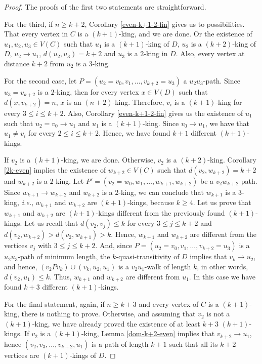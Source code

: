\documentclass[preprint]{elsarticle}
\begin{document}
\begin{proof}
The proofs of the first two statements are straightforward.

For the third, if $n \ge k+2$, Corollary \ref{even-k+1-2-fin} gives us to possibilities.   That every vertex in $C$ is a $(k+1)$-king, and we are done.   Or the existence of $u_1, u_2, u_3 \in V(C)$ such that $u_1$ is a $(k+1)$-king of $D$, $u_2$ is a $(k+2)$-king of $D$, $u_2 \to u_1$, $d(u_2, u_3) = k+2$ and $u_3$ is a $2$-king in $D$.   Also, every vertex at distance $k+2$ from $u_2$ is a $3$-king.

For the second case, let $P = (u_2 = v_0, v_1, \dots, v_{k+2} = u_3)$ a $u_2 u_3$-path.   Since $u_3 = v_{k+2}$ is a $2$-king, then for every vertex $x \in V(D)$ such that $d(x, v_{k+2}) = n$, $x$ is an $(n+2)$-king.   Therefore, $v_i$ is a $(k+1)$-king for every $3 \le i \le k+2$.   Also, Corollary \ref{even-k+1-2-fin} gives us the existence of $u_1$ such that $u_2 = v_0 \to u_1$ and $u_1$ is a $(k+1)$-king.   Since $v_0 \to u_1$, we have that $u_1 \ne v_i$ for every $2 \le i \le k+2$.   Hence, we have found $k+1$ different $(k+1)$-kings.

If $v_2$ is a $(k+1)$-king, we are done.   Otherwise, $v_2$ is a $(k+2)$-king.   Corollary \ref{2k-even} implies the existence of $w_{k+2} \in V(C)$ such that $d(v_2, w_{k+2}) = k+2$ and $w_{k+2}$ is a $2$-king.   Let $P' = (v_2 = w_0, w_1, \dots, w_{k+1}, w_{k+2})$ be a $v_2 w_{k+2}$-path.   Since $w_{k+1} \to w_{k+2}$ and $w_{k+2}$ is a $2$-king, we can conclude that $w_{k+1}$ is a $3$-king, \emph{i.e.}, $w_{k+1}$ and $w_{k+2}$ are $(k+1)$-kings, because $k \ge 4$.   Let us prove that $w_{k+1}$ and $w_{k+2}$ are $(k+1)$-kings different from the previously found $(k+1)$-kings.   Let us recall that $d(v_2, v_j) \le k$ for every $3 \le j \le k+2$ and $d(v_2, w_{k+2}) > d(v_2, w_{k+1}) > k$.   Hence, $w_{k+1}$ and $w_{k+2}$ are different from the vertices $v_j$ with $3 \le j \le k+2$.   And, since $P = (u_2 = v_0, v_1, \dots, v_{k+2} = u_3)$ is a $u_2 u_3$-path of minimum length, the $k$-quasi-transitivity of $D$ implies that $v_k \to u_2$, and hence, $(v_2 P v_k) \cup (v_k, u_2, u_1)$ is a $v_2 u_1$-walk of length $k$, in other words, $d(v_2, u_1) \le k$.   Thus, $w_{k+1}$ and $w_{k+2}$ are different from $u_1$.   In this case we have found $k+3$ different $(k+1)$-kings.

For the final statement, again, if $n \ge k+3$ and every vertex of $C$ is a $(k+1)$-king, there is nothing to prove.   Otherwise, and assuming that $v_2$ is not a $(k+1)$-king, we have already proved the existence of at least $k+3$ $(k+1)$-kings.   If $v_2$ is a $(k+1)$-king, Lemma \ref{dom-k+2-even} implies that $v_{k+2} \to u_1$, hence $(v_2, v_3, \dots, v_{k+2}, u_1)$ is a path of length $k+1$ such that all its $k+2$ vertices are $(k+1)$-kings of $D$.
\end{proof}
\end{document}
